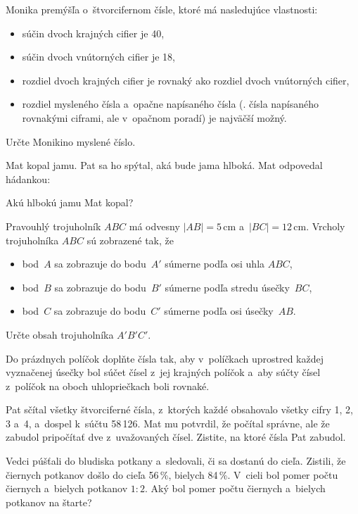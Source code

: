 {%
Monika premýšľa o~štvorcifernom čísle, ktoré má nasledujúce vlastnosti:
\begin{itemize}
\item súčin dvoch krajných cifier je 40,
\item súčin dvoch vnútorných cifier je 18,
\item rozdiel dvoch krajných cifier je rovnaký ako rozdiel dvoch vnútorných cifier,
\item
rozdiel mysleného čísla a~opačne napísaného čísla (\tj. čísla napísaného rovnakými ciframi, ale v~opačnom poradí)
je najväčší možný.
\end{itemize}
\noindent
Určte Monikino myslené číslo.
}

{%
Mat kopal jamu.
Pat sa ho spýtal, aká bude jama hlboká.
Mat odpovedal hádankou:


Akú hlbokú jamu Mat kopal?
}

{%
Pravouhlý trojuholník $ABC$ má odvesny $|AB|=5$\,cm a~$|BC|=12$\,cm.
Vrcholy trojuholníka $ABC$ sú zobrazené tak, že
\begin{itemize}
\item bod~$A$ sa zobrazuje do bodu~$A'$ súmerne podľa osi uhla $ABC$,
\item bod~$B$ sa zobrazuje do bodu~$B'$ súmerne podľa stredu úsečky~$BC$,
\item bod~$C$ sa zobrazuje do bodu~$C'$ súmerne podľa osi úsečky~$AB$.
\end{itemize}
\noindent
Určte obsah trojuholníka $A'B'C'$.
}

{%
Do prázdnych políčok doplňte čísla tak, aby
v~políčkach uprostred každej vyznačenej úsečky bol súčet čísel z~jej krajných políčok
a~aby súčty čísel z~políčok na oboch uhlopriečkach boli rovnaké.
\ifobrazkyvedla\else{}\fi
}

{%
Pat sčítal všetky štvorciferné čísla, z~ktorých každé obsahovalo všetky cifry 1, 2, 3 a~4, a~dospel k~súčtu 58\,126.
Mat mu potvrdil, že počítal správne, ale že zabudol pripočítať dve z~uvažovaných čísel.
Zistite, na ktoré čísla Pat zabudol.}

{%
Vedci púšťali do bludiska potkany a~sledovali, či sa dostanú do cieľa.
Zistili, že čiernych potkanov došlo do cieľa 56\,\%, bielych 84\,\%.
V~cieli bol pomer počtu čiernych a~bielych potkanov $1:2$.
Aký bol pomer počtu čiernych a~bielych potkanov na štarte?}

